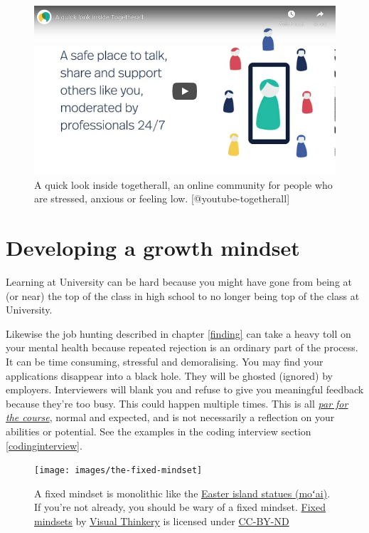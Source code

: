 \documentclass[
]{book}
\begin{document}
\begin{figure}

{\centering \includegraphics[width=0.99\linewidth]{images/youtube-togetherall} 

}

\caption{A quick look inside togetherall, an online community for people who are stressed, anxious or feeling low. [@youtube-togetherall]}\label{fig:togetherall-fig}
\end{figure}

\hypertarget{growthmindset}{%
\section{Developing a growth mindset}\label{growthmindset}}

Learning at University can be hard because you might have gone from being at (or near) the top of the class in high school to no longer being top of the class at University.

Likewise the job hunting described in chapter \ref{finding} can take a heavy toll on your mental health because repeated rejection is an ordinary part of the process. It can be time consuming, stressful and demoralising. You may find your applications disappear into a black hole. They will be ghosted (ignored) by employers. Interviewers will blank you and refuse to give you meaningful feedback because they're too busy. This could happen multiple times. This is all \emph{\href{https://en.wiktionary.org/wiki/par_for_the_course}{par for the course}}, normal and expected, and is not necessarily a reflection on your abilities or potential. See the examples in the coding interview section \ref{codinginterview}. \citep{youtube-petia}

\begin{figure}

{\centering \texttt{[image: images/the-fixed-mindset]} 

}

\caption{A fixed mindset is monolithic like the \href{https://en.wikipedia.org/wiki/Moai}{Easter island statues (moʻai)}. If you're not already, you should be wary of a fixed mindset. \href{https://bryanmmathers.com/fixed-mindsets/}{Fixed mindsets} by \href{https://visualthinkery.com}{Visual Thinkery} is licensed under \href{https://creativecommons.org/licenses/by-nd/4.0/}{CC-BY-ND}}\label{fig:fixedminset-fig}
\end{figure}
\end{document}
